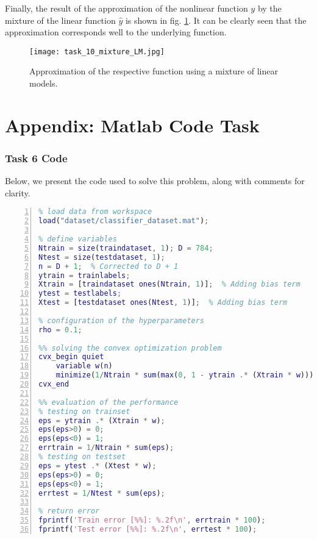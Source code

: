 \documentclass[a4paper,12pt]{report}
\begin{document}
Finally, the result of the approximation of the nonlinear function $y$ by the mixture of the linear function $\hat{y}$ is shown in fig. \ref{task_10_mixture_LM}. It can be clearly seen that the approximation corresponds well to the underlying function.
\begin{figure}[htbp]
    \centering
        \texttt{[image: task\_10\_mixture\_LM.jpg]}
        \caption{Approximation of the respective function using a mixture of linear models.}
        \label{task_10_mixture_LM}
\end{figure}


\chapter{Appendix: Matlab Code Task}

\subsection{Task 6 Code}
Below, we present the code used to solve this problem, along with comments for clarity.

\begin{lstlisting}[language=Matlab, style=Matlab-editor, frame=single, numbers=left]
%% setup the data
% load data from workspace
load("dataset/classifier_dataset.mat");

% define variables
Ntrain = size(traindataset, 1); D = 784;
Ntest = size(testdataset, 1);
n = D + 1;  % Corrected to D + 1
ytrain = trainlabels;
Xtrain = [traindataset ones(Ntrain, 1)];  % Adding bias term
ytest = testlabels;
Xtest = [testdataset ones(Ntest, 1)];  % Adding bias term

% configuration of the hyperparameters
rho = 0.1;

%% solving the convex optimization problem
cvx_begin quiet
    variable w(n)  
    minimize(1/Ntrain * sum(max(0, 1 - ytrain .* (Xtrain * w))) + rho * square_pos(norm(w(1:D))));  
cvx_end

%% evaluation of the performance
% testing on trainset
eps = ytrain .* (Xtrain * w);
eps(eps>0) = 0; 
eps(eps<0) = 1; 
errtrain = 1/Ntrain * sum(eps);
% testing on testset
eps = ytest .* (Xtest * w);
eps(eps>0) = 0;
eps(eps<0) = 1; 
errtest = 1/Ntest * sum(eps);

% return error 
fprintf('Train error [%%]: %.2f\n', errtrain * 100);
fprintf('Test error [%%]: %.2f\n', errtest * 100);

\end{lstlisting}
\end{document}
